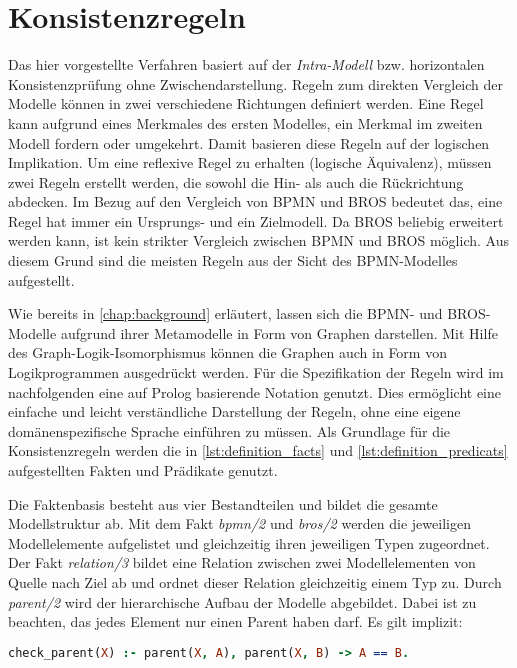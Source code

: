 \section{Konsistenzregeln} \label{sec:Konsistenzregeln}

Das hier vorgestellte Verfahren basiert auf der \emph{Intra-Modell} bzw. horizontalen Konsistenzprüfung ohne Zwischendarstellung.
Regeln zum direkten Vergleich der Modelle können in zwei verschiedene Richtungen definiert werden.
Eine Regel kann aufgrund eines Merkmales des ersten Modelles, ein Merkmal im zweiten Modell fordern oder umgekehrt.
Damit basieren diese Regeln auf der logischen Implikation.
Um eine reflexive Regel zu erhalten (logische Äquivalenz), müssen zwei Regeln erstellt werden, die sowohl die Hin- als auch die Rückrichtung abdecken.
Im Bezug auf den Vergleich von BPMN und BROS bedeutet das, eine Regel hat immer ein Ursprungs- und ein Zielmodell.
Da BROS beliebig erweitert werden kann, ist kein strikter Vergleich zwischen BPMN und BROS möglich.
Aus diesem Grund sind die meisten Regeln aus der Sicht des BPMN-Modelles aufgestellt.

Wie bereits in \cref{chap:background} erläutert, lassen sich die BPMN- und BROS-Modelle aufgrund ihrer Metamodelle in Form von Graphen darstellen.
Mit Hilfe des Graph-Logik-Isomorphismus können die Graphen auch in Form von Logikprogrammen ausgedrückt werden.
Für die Spezifikation der Regeln wird im nachfolgenden eine auf Prolog basierende Notation genutzt.
Dies ermöglicht eine einfache und leicht verständliche Darstellung der Regeln, ohne eine eigene domänenspezifische Sprache einführen zu müssen.
Als Grundlage für die Konsistenzregeln werden die in \cref{lst:definition_facts} und \cref{lst:definition_predicats} aufgestellten Fakten und Prädikate genutzt.

Die Faktenbasis besteht aus vier Bestandteilen und bildet die gesamte Modellstruktur ab.
Mit dem Fakt \emph{bpmn/2} und \emph{bros/2} werden die jeweiligen Modellelemente aufgelistet und gleichzeitig ihren jeweiligen Typen zugeordnet.
Der Fakt \emph{relation/3} bildet eine Relation zwischen zwei Modellelementen von Quelle nach Ziel ab und ordnet dieser Relation gleichzeitig einem Typ zu.
Durch \emph{parent/2} wird der hierarchische Aufbau der Modelle abgebildet.
Dabei ist zu beachten, das jedes Element nur einen Parent haben darf.
Es gilt implizit:

\begin{lstlisting}[language=Prolog,frame=none]
check_parent(X) :- parent(X, A), parent(X, B) -> A == B.
\end{lstlisting}
\pagebreak
    
